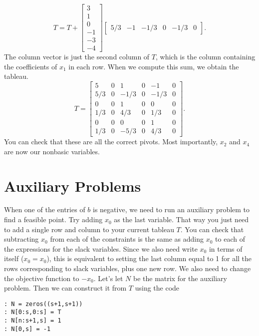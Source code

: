 \[
	T = T + \begin{bmatrix}3 \\ 1 \\ 0 \\ -1 \\ -3 \\ -4\end{bmatrix}\begin{bmatrix} 5/3 & -1 & -1/3 & 0 & -1/3 & 0\end{bmatrix}.
\]
The column vector is just the second column of $T$, which is the column containing the coefficients of $x_1$ in each row. When we compute this sum, we obtain the tableau.
\[
	T = \begin{bmatrix}
		5 &  0 & 1 & 0 & -1 & 0 \\
		5/3 & 0 &-1/3 & 0 &-1/3 & 0 \\
		0 & 0 & 1 & 0 & 0 & 0 \\
		1/3 & 0 & 4/3 & 0 & 1/3 & 0 \\
		0 & 0 & 0 & 0 & 1 & 0 \\
		1/3 & 0 & -5/3 & 0 & 4/3 & 0
	\end{bmatrix}.
\]
You can check that these are all the correct pivots. Most importantly, $x_2$ and $x_4$ are now our nonbasic variables.



\section*{Auxiliary Problems}

When one of the entries of $b$ is negative, we need to run an auxiliary problem to find a feasible point. Try adding $x_0$ as the last variable. That way you just need to add a single row and column to your current tableau $T$. You can check that subtracting $x_0$ from each of the constraints is the same as adding $x_0$ to each of the expressions for the slack variables. Since we also need write $x_0$ in terms of itself ($x_0 = x_0$), this is equivalent to setting the last column equal to 1 for all the rows corresponding to slack variables, plus one new row. We also need to change the objective function to $-x_0$. Let's let $N$ be the matrix for the auxiliary problem. Then we can construct it from $T$ using the code 
\begin{lstlisting}
: N = zeros((s+1,s+1))
: N[0:s,0:s] = T
: N[n:s+1,s] = 1
: N[0,s] = -1
\end{lstlisting}

